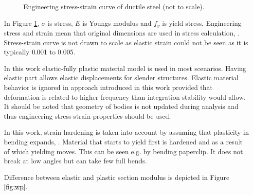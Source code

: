 \begin{figure}[htb!]
\centering
{}
\caption{Engineering stress-strain curve of ductile steel (not to scale).}
\label{fig:sscurve}
\end{figure}

In Figure \ref{fig:sscurve}, $\sigma$ is stress, $E$ is Youngs modulus and $f_y$ is yield stress.
Engineering stress and strain mean that original dimensions are used in stress calculation,
\citet{dowling}.
Stress-strain curve is not drawn to scale as elastic strain could not be seen as it is typically 0.001 to 0.005.

In this work elastic-fully plastic material model is used in most scenarios.
Having elastic part allows elastic displacements for slender structures. 
Elastic material behavior is ignored in approach introduced in this work provided
that deformation is related to higher frequency
than integration stability would allow.
It should be noted that geometry
of bodies is not updated during analysis and thus engineering stress-strain properties should
be used.

In this work, strain hardening is taken into account by assuming that plasticity in bending
expands, 
\citet{dowling}.
Material that starts to yield first is hardened and as a result of which yielding moves.
This can be seen e.g. by bending paperclip. It does not break at low angles but can take few full bends. 

Difference between elastic and plastic section modulus is depicted in Figure \ref{fig:wp}.

